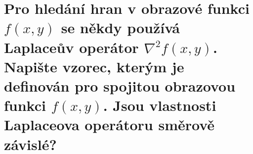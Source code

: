 \section{Pro hledání hran v obrazové funkci $f(x,y)$ se někdy používá Laplaceův operátor $\nabla^{2}f(x,y)$. Napište 
vzorec, kterým je definován pro spojitou obrazovou funkci $f(x,y)$. Jsou vlastnosti Laplaceova operátoru směrově 
závislé?}